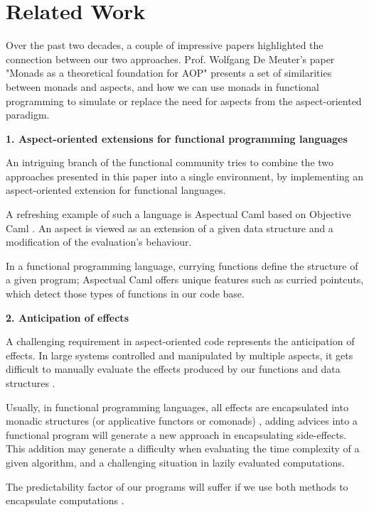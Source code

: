 
\section{Related Work}
\label{sec::related::work}

Over the past two decades, a couple of impressive papers highlighted the connection between our two approaches. Prof. Wolfgang De Meuter's paper "Monads as a theoretical foundation for AOP" \cite{monthfoundaop} presents a set of similarities between monads and aspects, and how we can use monads in functional programming to simulate or replace the need for aspects from the aspect-oriented paradigm.

\large{\textbf{1. Aspect-oriented extensions for functional programming languages}}

An intriguing branch of the functional community tries to combine the two approaches presented in this paper into a single environment, by implementing an aspect-oriented extension for functional languages. 

A refreshing example of such a language is Aspectual Caml based on Objective Caml \cite{inproceedings}. An aspect is viewed as an extension of a given data structure and a modification of the evaluation's behaviour. 

In a functional programming language, currying functions define the structure of a given program; Aspectual Caml offers unique features such as curried pointcuts, which detect those types of functions in our code base.

\large{\textbf{2. Anticipation of effects}}

A challenging requirement in aspect-oriented code represents the anticipation of effects. In large systems controlled and manipulated by multiple aspects, it gets difficult to manually evaluate the effects produced by our functions and data structures \cite{Wang:2009:APM:1596614.1596621}.

Usually, in functional programming languages, all effects are encapsulated into monadic structures (or applicative functors or comonads) \cite{Wang:2009:APM:1596614.1596621}, adding advices into a functional program will generate a new approach in encapsulating side-effects. This addition may generate a difficulty when evaluating the time complexity of a given algorithm, and a challenging situation in lazily evaluated computations.

The predictability factor of our programs will suffer if we use both methods to encapsulate computations \cite{Wang:2009:APM:1596614.1596621}.
